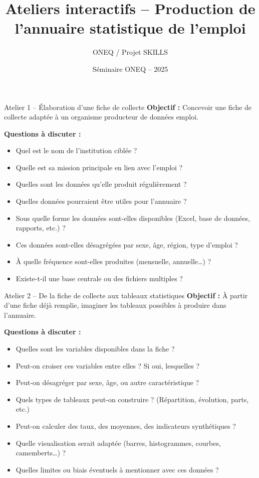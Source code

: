 \documentclass{beamer}
\title[Ateliers sur la production de l'annuaire]{Ateliers interactifs -- Production de l'annuaire statistique de l'emploi}
\author{ONEQ / Projet SKILLS}
\date{Séminaire ONEQ -- 2025}
\begin{document}
\begin{frame}
  \titlepage
\end{frame}

\begin{frame}{Atelier 1 – Élaboration d’une fiche de collecte}
\large
\textbf{Objectif :} Concevoir une fiche de collecte adaptée à un organisme producteur de données emploi.

\pause
\textbf{Questions à discuter :}
\begin{itemize}
  \item Quel est le nom de l’institution ciblée ?
  \item Quelle est sa mission principale en lien avec l’emploi ?
  \item Quelles sont les données qu’elle produit régulièrement ?
  \item Quelles données pourraient être utiles pour l’annuaire ?
  \item Sous quelle forme les données sont-elles disponibles (Excel, base de données, rapports, etc.) ?
  \item Ces données sont-elles désagrégées par sexe, âge, région, type d’emploi ?
  \item À quelle fréquence sont-elles produites (mensuelle, annuelle…) ?
  \item Existe-t-il une base centrale ou des fichiers multiples ?
\end{itemize}
\end{frame}

\begin{frame}{Atelier 2 – De la fiche de collecte aux tableaux statistiques}
\large
\textbf{Objectif :} À partir d’une fiche déjà remplie, imaginer les tableaux possibles à produire dans l’annuaire.

\pause
\textbf{Questions à discuter :}
\begin{itemize}
  \item Quelles sont les variables disponibles dans la fiche ?
  \item Peut-on croiser ces variables entre elles ? Si oui, lesquelles ?
  \item Peut-on désagréger par sexe, âge, ou autre caractéristique ?
  \item Quels types de tableaux peut-on construire ? (Répartition, évolution, parts, etc.)
  \item Peut-on calculer des taux, des moyennes, des indicateurs synthétiques ?
  \item Quelle visualisation serait adaptée (barres, histogrammes, courbes, camemberts…) ?
  \item Quelles limites ou biais éventuels à mentionner avec ces données ?
\end{itemize}
\end{frame}
\end{document}
